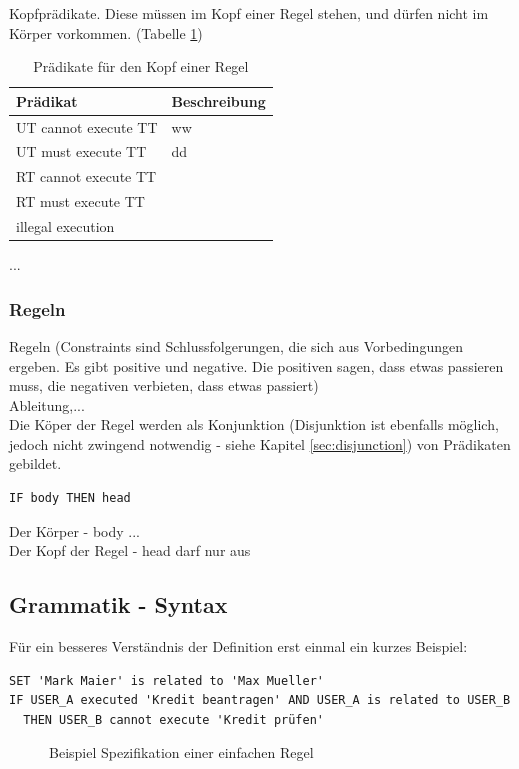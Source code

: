 Kopfprädikate. Diese müssen im Kopf einer Regel stehen, und dürfen nicht im Körper vorkommen. (Tabelle \ref{tab:head})
\begin{table}[h]
\begin{tabular} {|p{6cm}|p{10cm}|}
\hline
\textbf{Prädikat} & \textbf{Beschreibung}\\
\hline
UT cannot execute TT		& ww \\
UT must execute TT  		& dd \\
RT cannot execute TT		& \\
RT must execute TT		& \\
illegal execution		& \\
\hline
\end{tabular}
...
\caption{Prädikate für den Kopf einer Regel}
\label{tab:head}
\end{table}



\subsubsection{Regeln}
Regeln (Constraints sind Schlussfolgerungen, die sich aus Vorbedingungen ergeben. Es gibt positive und negative. Die positiven sagen, dass etwas passieren muss, die negativen verbieten, dass etwas passiert)\\
Ableitung,...\\
Die Köper der Regel werden als Konjunktion (Disjunktion ist ebenfalls möglich, jedoch nicht zwingend notwendig - siehe Kapitel \ref{sec:disjunction}) von Prädikaten gebildet.\\

\begin{verbatim}
IF body THEN head
\end{verbatim}

Der Körper - body ...\\
Der Kopf der Regel - head darf nur aus 

\subsection{Grammatik - Syntax}
Für ein besseres Verständnis der Definition erst einmal ein kurzes Beispiel:\\

\begin{verbatim}
SET 'Mark Maier' is related to 'Max Mueller'
IF USER_A executed 'Kredit beantragen' AND USER_A is related to USER_B
  THEN USER_B cannot execute 'Kredit prüfen'
\end{verbatim}
\begin{figure}[!h]
\caption{Beispiel Spezifikation einer einfachen Regel}
\label{fig:demorulefile}
\end{figure}

